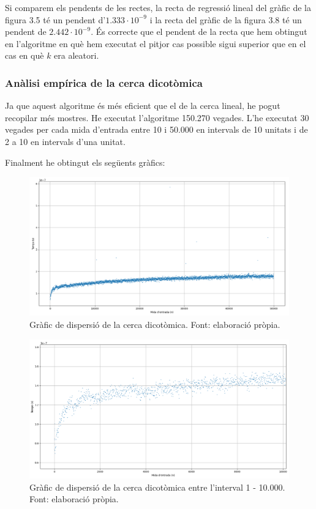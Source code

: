 Si comparem els pendents de les rectes, la recta de regressió lineal del gràfic de la figura 3.5 té un pendent d'$1.333 \cdot 10^{-9}$ i la recta del gràfic de la figura 3.8 té un pendent de $2.442 \cdot 10^{-9}$. És correcte que el pendent de la recta que hem obtingut en l'algoritme en què hem executat el pitjor cas possible sigui superior que en el cas en què $k$ era aleatori. 

\subsubsection{Anàlisi empírica de la cerca dicotòmica}
Ja que aquest algoritme és més eficient que el de la cerca lineal, he pogut recopilar més mostres. He executat l'algoritme 150.270 vegades. L'he executat 30 vegades per cada mida d'entrada entre 10 i 50.000 en intervals de 10 unitats i de 2 a 10 en intervals d'una unitat.

Finalment he obtingut els següents gràfics:
\begin{figure}[H]
    \centering
    \includegraphics[width=1\textwidth]{capitols/figures/5.png}
    \caption[Gràfic de dispersió de la cerca dicotòmica.]{Gràfic de dispersió de la cerca dicotòmica. Font: elaboració pròpia.}
    \label{fig:my_label}
\end{figure}
\begin{figure}[H]
    \centering
    \includegraphics[width=1\textwidth]{capitols/figures/6.png}
    \caption[Gràfic de dispersió de la cerca dicotòmica entre l'interval 1 - 10.000.]{Gràfic de dispersió de la cerca dicotòmica entre l'interval 1 - 10.000. Font: elaboració pròpia.}
    \label{fig:my_label}
\end{figure}

